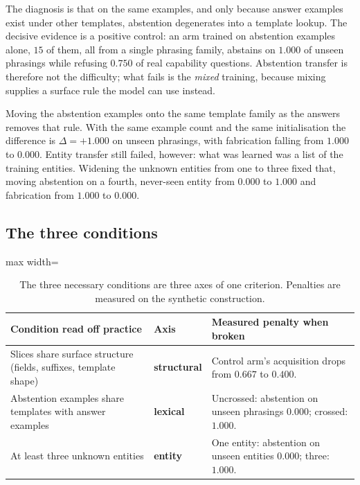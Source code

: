 \documentclass[11pt,a4paper]{article}
\newcommand{\good}[1]{\textcolor{green!45!black}{\textbf{#1}}}
\newcommand{\bad}[1]{\textcolor{red!70!black}{\textbf{#1}}}
\begin{document}
The diagnosis is that on the same examples, and only because answer examples
exist under other templates, abstention degenerates into a template lookup. The
decisive evidence is a positive control: an arm trained on abstention examples
alone, $15$ of them, all from a single phrasing family, abstains on $1.000$ of
unseen phrasings while refusing $0.750$ of real capability questions.
Abstention transfer is therefore not the difficulty; what fails is the
\emph{mixed} training, because mixing supplies a surface rule the model can use
instead.

Moving the abstention examples onto the same template family as the answers
removes that rule. With the same example count and the same initialisation the
difference is $\Delta=+1.000$ on unseen phrasings, with fabrication falling
from $1.000$ to $0.000$. Entity transfer still failed, however: what was
learned was a list of the training entities. Widening the unknown entities from
one to three fixed that, moving abstention on a fourth, never-seen entity from
$0.000$ to $1.000$ and fabrication from $1.000$ to $0.000$.

\subsection{The three conditions}
\label{sec:conditions}

\begin{table}[t]\centering\small
\caption{The three necessary conditions are three axes of one criterion.
Penalties are measured on the synthetic construction.}
\label{tab:conditions}
\begin{adjustbox}{max width=\linewidth}
\begin{tabular}{@{}p{}p{}p{}@{}}
\toprule
Condition read off practice & Axis & Measured penalty when broken \\
\midrule
Slices share surface structure (fields, suffixes, template shape) &
\textbf{structural} &
Control arm's acquisition drops from $0.667$ to $0.400$. \\
Abstention examples share templates with answer examples & \textbf{lexical} &
Uncrossed: abstention on unseen phrasings \bad{$0.000$}; crossed:
\good{$1.000$}. \\
At least three unknown entities & \textbf{entity} &
One entity: abstention on unseen entities \bad{$0.000$}; three:
\good{$1.000$}. \\
\bottomrule
\end{tabular}
\end{adjustbox}
\end{table}
\end{document}
